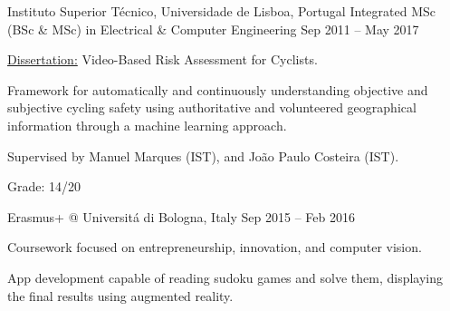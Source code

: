 \begin{cventries}

  \cventry
    {Instituto Superior Técnico, Universidade de Lisboa, Portugal} %
    {Integrated MSc (BSc \& MSc) in Electrical \& Computer Engineering} %
    {Sep 2011 – May 2017} %
    {
      \begin{cvitems} %
        \item {\underline{Dissertation:} Video-Based Risk Assessment for Cyclists.}
        \item {Framework for automatically and continuously understanding objective and subjective cycling safety using authoritative and volunteered geographical information through a machine learning approach.}
        \item {Supervised by Manuel Marques (IST), and João Paulo Costeira (IST).}
      \end{cvitems}
    }
    {
        Grade: 14/20
    }

  \cventryinner
    {Erasmus+ @ Universitá di Bologna, Italy} %
    {Sep 2015 – Feb 2016} %
    {
    	\begin{cvitems} %
    		\item {Coursework focused on entrepreneurship, innovation, and computer vision.}
    		\item {App development capable of reading sudoku games and solve them, displaying the final results using augmented reality.}
    	\end{cvitems}
    }
    { 	
    }
 
\end{cventries}
